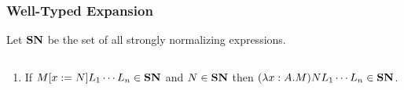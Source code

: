 
\subsubsection{Well-Typed Expansion}

Let $\mathbf{SN}$ be the set of all strongly normalizing expressions.

\begin{prop}
\label{prop:SN}
$ $
\begin{enumerate}
\item
\label{prop:SNT}
If $M[x:=N]L_1 \cdots L_n \in \mathbf{SN}$ and $N \in \mathbf{SN}$ then $(\lambda x:A.M)NL_1 \cdots L_n \in \mathbf{SN}$.

\end{enumerate}
\end{prop}
